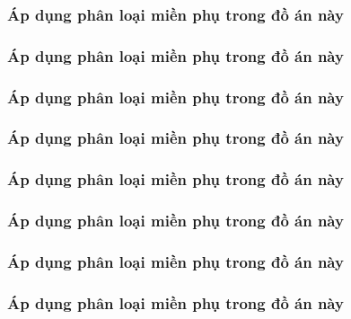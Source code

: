 


\subsubsection{Áp dụng phân loại miền phụ trong đồ án này}

\subsubsection{Áp dụng phân loại miền phụ trong đồ án này}

\subsubsection{Áp dụng phân loại miền phụ trong đồ án này}

\subsubsection{Áp dụng phân loại miền phụ trong đồ án này}

\subsubsection{Áp dụng phân loại miền phụ trong đồ án này}

\subsubsection{Áp dụng phân loại miền phụ trong đồ án này}

\subsubsection{Áp dụng phân loại miền phụ trong đồ án này}

\subsubsection{Áp dụng phân loại miền phụ trong đồ án này}


